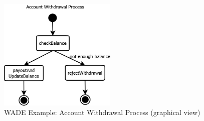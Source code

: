 \begin{figure}[h]
		\centering
		\includegraphics[width=0.5\textwidth]{images/wade_example.png}
		\caption{WADE Example: Account Withdrawal Process (graphical view)}
	  \label{fig:wade_graph}
\end{figure}
\newpage
